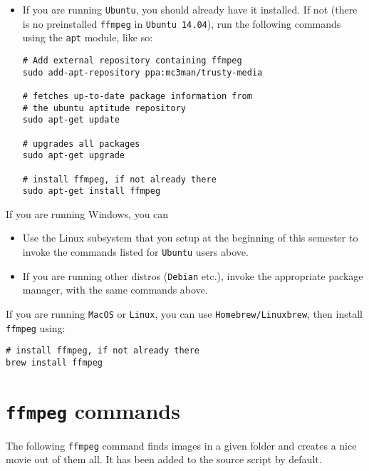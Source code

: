 \documentclass[11pt]{article}
\begin{document}
\begin{itemize}
\item If you are running \texttt{Ubuntu}, you should already have it installed. If not
(there is no preinstalled \texttt{ffmpeg} in \texttt{Ubuntu 14.04}),
run	the following commands using the \texttt{apt} module, like so:
\begin{verbatim}
# Add external repository containing ffmpeg
sudo add-apt-repository ppa:mc3man/trusty-media

# fetches up-to-date package information from
# the ubuntu aptitude repository
sudo apt-get update

# upgrades all packages
sudo apt-get upgrade

# install ffmpeg, if not already there
sudo apt-get install ffmpeg
\end{verbatim}
\end{itemize}

If you are running Windows, you can

\begin{itemize}
\item Use the Linux subsystem that you setup at the beginning of this semester to
invoke the commands listed for \texttt{Ubuntu} users above.
\item If you are running other distros (\texttt{Debian} etc.), invoke the appropriate package
manager, with the same commands above.
\end{itemize}

If you are running \texttt{MacOS} or \texttt{Linux}, you can use \texttt{Homebrew/Linuxbrew}, then
install \texttt{ffmpeg} using:
\begin{verbatim}
# install ffmpeg, if not already there
brew install ffmpeg
\end{verbatim}
\section{\texttt{ffmpeg} commands}
\label{sec:org3428bce}
The following \texttt{ffmpeg} command finds images in a given folder and creates a
nice movie out of them all. It has been added to the source script by default.
\end{document}
